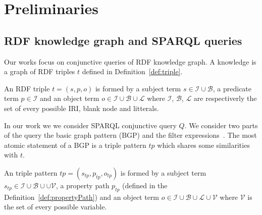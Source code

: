 \section{Preliminaries}





\subsection{RDF knowledge graph and SPARQL queries}
Our works focus on conjunctive queries of RDF knowledge graph.
A knowledge is a graph of RDF triples $t$ defined in Definition~\ref{def:triple}.

\begin{definition}\label{def:triple}
    An RDF triple $t = (s,p,o)$ is formed by a  subject term $s \in \mathcal{I} \cup \mathcal{B}$, a predicate term  $p \in \mathcal{I}$ and an object term $o \in \mathcal{I} \cup \mathcal{B} \cup \mathcal{L}$
    where $\mathcal{I}$, $\mathcal{B}$, $\mathcal{L}$ are respectiverly the set of every possible IRI, blank node and litterals.
\end{definition}

In our work we we consider SPARQL conjunctive query $Q$.
We consider two parts of the query the basic graph pattern (BGP) and the filter expressions~.
The most atomic statement of a BGP is a triple pattern $tp$ which shares some similarities with $t$.

\begin{definition}\label{def:triplePattern}
    An triple pattern $tp = (s_{tp},p_{tp},o_{tp})$ is formed by a subject term $s_{tp} \in \mathcal{I} \cup \mathcal{B} \cup \cup \mathcal{V}$, 
    a property path  $p_{tp}$ (defined in the Definition~\ref{def:propertyPath}) and an object term  $o \in \mathcal{I} \cup \mathcal{B} \cup \mathcal{L} \cup \mathcal{V}$ 
    where $\mathcal{V}$ is the set of every possible variable. 
\end{definition}

